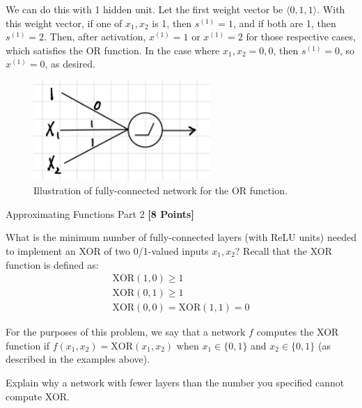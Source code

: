 \begin{solution}
    We can do this with 1 hidden unit. Let the first weight vector be $\langle 0, 1, 1 \rangle$. With this weight vector, if one of $x_1, x_2$ is 1, then $s^{(1)} = 1$, and if both are 1, then $s^{(1)} = 2$. Then, after activation, $x^{(1)} = 1$ or $x^{(1)} = 2$ for those respective cases, which satisfies the OR function. In the case where $x_1, x_2 = 0, 0$, then $s^{(1)} = 0$, so $x^{(1)} = 0$, as desired.

    \begin{figure}[H]
        \centering
        \includegraphics[width=0.6\textwidth]{images/1d.png}
        \caption{Illustration of fully-connected network for the OR function.}
        \label{fig:1d}
    \end{figure}
\end{solution}

\problem Approximating Functions Part 2 \textbf{[8 Points]}

What is the minimum number of fully-connected layers (with ReLU units) needed to implement an XOR of two 0/1-valued inputs $x_1, x_2$? Recall that the XOR function is defined as:
\begin{gather*}
\text{XOR}(1, 0) \geq 1 \\
\text{XOR}(0, 1) \geq 1 \\
\text{XOR}(0, 0) = \text{XOR}(1, 1) = 0
\end{gather*}

For the purposes of this problem, we say that a network $f$ computes the XOR function if $f(x_1, x_2) = \text{XOR}(x_1, x_2)$ when $x_1 \in \{0, 1\}$ and $x_2 \in \{0, 1\}$ (as described in the examples above).

Explain why a network with fewer layers than the number you specified cannot compute XOR.


